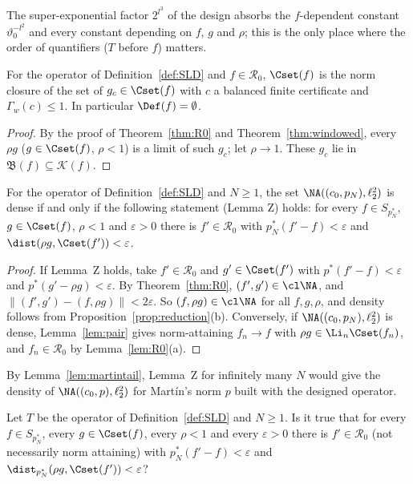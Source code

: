 The super-exponential factor $2^{l^3}$ of the design absorbs the
$f$-dependent constant $\vartheta_0^{-l^2}$ and every constant depending on
$f$, $g$ and $\rho$; this is the only place where the order of quantifiers
($T$ before $f$) matters.

\begin{corollary}\label{cor:nodefectR0}
For the operator of Definition~\ref{def:SLD} and $f\in\mathcal R_0$,
$\Cset(f)$ is the norm closure of the set of $g_c\in\Cset(f)$ with $c$ a
balanced finite certificate and $\Gamma_w(c)\le1$.  In particular
$\Def(f)=\emptyset$.
\end{corollary}

\begin{proof}
By the proof of Theorem~\ref{thm:R0} and Theorem~\ref{thm:windowed}, every
$\rho g$ ($g\in\Cset(f)$, $\rho<1$) is a limit of such $g_c$; let
$\rho\to1$.  These $g_c$ lie in $\mathfrak B(f)\subseteq\mathcal K(f)$.
\end{proof}

\begin{theorem}[Reduction]\label{thm:reductionZ}
For the operator of Definition~\ref{def:SLD} and $N\ge1$, the set
$\NA((c_0,p_N),\ell_2^2)$ is dense if and only if the following statement
\textup{(Lemma Z)} holds: for every $f\in S_{p_N^*}$, $g\in\Cset(f)$,
$\rho<1$ and $\varepsilon>0$ there is $f'\in\mathcal R_0$ with
$p_N^*(f'-f)<\varepsilon$ and $\dist(\rho g,\Cset(f'))<\varepsilon$.
\end{theorem}

\begin{proof}
If Lemma~Z holds, take $f'\in\mathcal R_0$ and $g'\in\Cset(f')$ with
$p^*(f'-f)<\varepsilon$ and $p^*(g'-\rho g)<\varepsilon$.  By
Theorem~\ref{thm:R0}, $(f',g')\in\cl\NA$, and $\|(f',g')-(f,\rho g)\|<
2\varepsilon$.  So $(f,\rho g)\in\cl\NA$ for all $f,g,\rho$, and density
follows from Proposition~\ref{prop:reduction}(b).  Conversely, if
$\NA((c_0,p_N),\ell_2^2)$ is dense, Lemma~\ref{lem:pair} gives
norm-attaining $f_n\to f$ with $\rho g\in\Li_n\Cset(f_n)$, and
$f_n\in\mathcal R_0$ by Lemma~\ref{lem:R0}(a).
\end{proof}

By Lemma~\ref{lem:martintail}, Lemma~Z for infinitely many $N$ would give
the density of $\NA((c_0,p),\ell_2^2)$ for Mart\'in's norm $p$ built with
the designed operator.

\begin{problem}[Lemma Z]\label{prob:lemmaZ}
Let $T$ be the operator of Definition~\ref{def:SLD} and $N\ge1$.  Is it true
that for every $f\in S_{p_N^*}$, every $g\in\Cset(f)$, every $\rho<1$ and
every $\varepsilon>0$ there is $f'\in\mathcal R_0$ \textup{(}not necessarily
norm attaining\textup{)} with $p_N^*(f'-f)<\varepsilon$ and
$\dist_{p_N^*}(\rho g,\Cset(f'))<\varepsilon$?
\end{problem}

